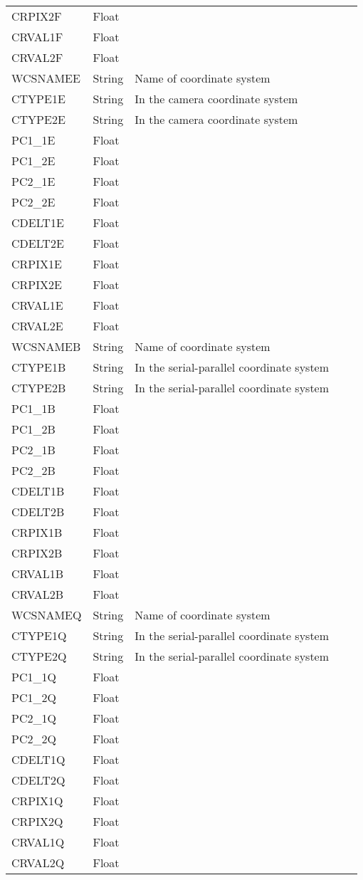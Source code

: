 \begin{longtable}{l l l l l}
CRPIX2F & Float &  \\
CRVAL1F & Float &  \\
CRVAL2F & Float &  \\
WCSNAMEE & String & Name of coordinate system \\
CTYPE1E & String & In the camera coordinate system \\
CTYPE2E & String & In the camera coordinate system \\
PC1\_1E & Float &  \\
PC1\_2E & Float &  \\
PC2\_1E & Float &  \\
PC2\_2E & Float &  \\
CDELT1E & Float &  \\
CDELT2E & Float &  \\
CRPIX1E & Float &  \\
CRPIX2E & Float &  \\
CRVAL1E & Float &  \\
CRVAL2E & Float &  \\
WCSNAMEB & String & Name of coordinate system \\
CTYPE1B & String & In the serial-parallel coordinate system \\
CTYPE2B & String & In the serial-parallel coordinate system \\
PC1\_1B & Float &  \\
PC1\_2B & Float &  \\
PC2\_1B & Float &  \\
PC2\_2B & Float &  \\
CDELT1B & Float &  \\
CDELT2B & Float &  \\
CRPIX1B & Float &  \\
CRPIX2B & Float &  \\
CRVAL1B & Float &  \\
CRVAL2B & Float &  \\
WCSNAMEQ & String & Name of coordinate system \\
CTYPE1Q & String & In the serial-parallel coordinate system \\
CTYPE2Q & String & In the serial-parallel coordinate system \\
PC1\_1Q & Float &  \\
PC1\_2Q & Float &  \\
PC2\_1Q & Float &  \\
PC2\_2Q & Float &  \\
CDELT1Q & Float &  \\
CDELT2Q & Float &  \\
CRPIX1Q & Float &  \\
CRPIX2Q & Float &  \\
CRVAL1Q & Float &  \\
CRVAL2Q & Float &  \\
\hline
\end{longtable}

